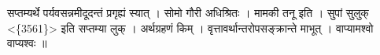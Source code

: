सप्तम्यर्थे पर्यवसन्नमीदूदन्तं प्रगृह्यं स्यात् । सोमो गौरी अधिश्रितः ।
मामकी तनू इति । सुपां सुलुक् \textless{}\{3561\}\textgreater{} इति
सप्तम्या लुक् । अर्थग्रहणं किम् । वृत्तावर्थान्तरोपसङ्क्रान्ते माभूत् ।
वाप्यामश्वो वाप्यश्वः ॥
